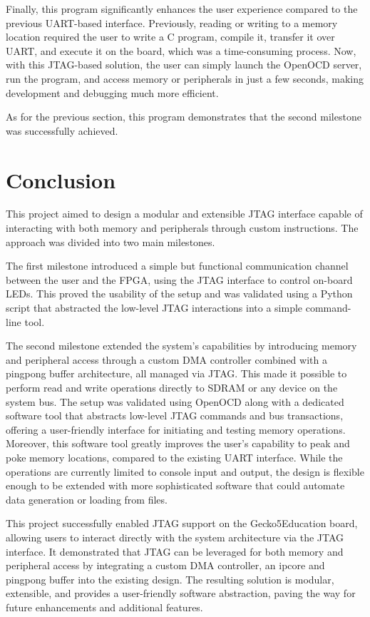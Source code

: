 \documentclass[a4paper,11pt,oneside]{report}
\newcommand{\boardName}{Gecko5Education \xspace}
\begin{document}
Finally, this program significantly enhances the user experience compared to the previous UART-based interface. 
Previously, reading or writing to a memory location required the user to write a C program, compile it, transfer it over UART, and execute it on the board, which was a time-consuming process. 
Now, with this JTAG-based solution, the user can simply launch the OpenOCD server, run the program, and access memory or peripherals in just a few seconds, making development and debugging much more efficient.

As for the previous section, this program demonstrates that the second milestone was successfully achieved.

\chapter{Conclusion}

This project aimed to design a modular and extensible JTAG interface capable of interacting with both memory and peripherals through custom instructions. The approach was divided into two main milestones.

The first milestone introduced a simple but functional communication channel between the user and the FPGA, using the JTAG interface to control on-board LEDs. 
This proved the usability of the setup and was validated using a Python script that abstracted the low-level JTAG interactions into a simple command-line tool.

The second milestone extended the system’s capabilities by introducing memory and peripheral access through a custom DMA controller combined with a pingpong buffer architecture, all managed via JTAG.
This made it possible to perform read and write operations directly to SDRAM or any device on the system bus. 
The setup was validated using OpenOCD along with a dedicated software tool that abstracts low-level JTAG commands and bus transactions, offering a user-friendly interface for initiating and testing memory operations.
Moreover, this software tool greatly improves the user's capability to peak and poke memory locations, compared to the existing UART interface.
While the operations are currently limited to console input and output, the design is flexible enough to be extended with more sophisticated software that could automate data generation or loading from files.

This project successfully enabled JTAG support on the \boardName board, allowing users to interact directly with the system architecture via the JTAG interface. 
It demonstrated that JTAG can be leveraged for both memory and peripheral access by integrating a custom DMA controller, an ipcore and pingpong buffer into the existing design. 
The resulting solution is modular, extensible, and provides a user-friendly software abstraction, paving the way for future enhancements and additional features.
\end{document}
